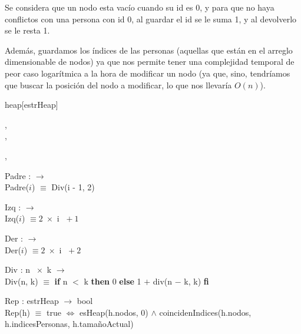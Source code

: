 \documentclass[../main.tex]{subfiles}
\begin{document}
\begin{representacion}
Se considera que un nodo esta vacío cuando su id es 0, y para que no haya conflictos con una persona con id 0, al guardar el id se le suma 1, y al devolverlo se le resta 1.

Además, guardamos los índices de las personas (aquellas que están en el arreglo dimensionable de nodos) ya que nos permite tener una complejidad temporal de peor caso logarítmica a la hora de modificar un nodo (ya que, sino, tendríamos que buscar la posición del nodo a modificar, lo que nos llevaría $O(n)$).

\begin{Estructura}{heap}[estrHeap]
    \begin{Tupla}
        ,\\%
        ,\\%
    \end{Tupla}

    \begin{Tupla}[nodo]
        ,\\%
    \end{Tupla}
\end{Estructura}

Padre : \nat $\longrightarrow$ \nat\\
Padre($i$) $\equiv$ Div(i - 1, 2)

Izq : \nat $\longrightarrow$ \nat\\
Izq($i$) $\equiv 2\; \times $ i $\; + 1$

Der : \nat $\longrightarrow$ \nat\\
Der($i$) $\equiv 2\; \times $ i $\; + 2$

Div : \nat \;n $\; \times$ \nat \;k $\longrightarrow$ \nat\\
Div(n, k) $\equiv$ \textbf{if} n $<$ k \textbf{then} 0 \textbf{else} 1 $+$ div(n $-$ k, k) \textbf{fi}

Rep : estrHeap $\longrightarrow$ bool\\
Rep(h) $\equiv$ true $\iff$ esHeap(h.nodos, 0) $\land$ coincidenIndices(h.nodos, h.indicesPersonas, h.tamañoActual)


\end{representacion}
\end{document}
